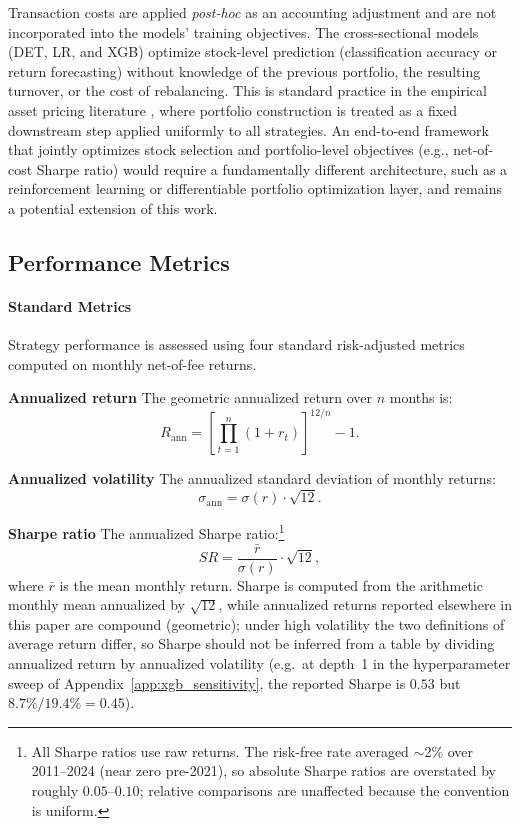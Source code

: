 Transaction costs are applied \emph{post-hoc} as an accounting adjustment and are not incorporated into the models' training objectives. The cross-sectional models (DET, LR, and XGB) optimize stock-level prediction (classification accuracy or return forecasting) without knowledge of the previous portfolio, the resulting turnover, or the cost of rebalancing. This is standard practice in the empirical asset pricing literature \citep[e.g.,][]{FamaFrench2015, GHM2023}, where portfolio construction is treated as a fixed downstream step applied uniformly to all strategies. An end-to-end framework that jointly optimizes stock selection and portfolio-level objectives (e.g., net-of-cost Sharpe ratio) would require a fundamentally different architecture, such as a reinforcement learning or differentiable portfolio optimization layer, and remains a potential extension of this work.

\subsection{Performance Metrics}\label{app:evaluation}

\paragraph{Standard Metrics}

Strategy performance is assessed using four standard risk-adjusted metrics computed on monthly net-of-fee returns.

\textbf{Annualized return} The geometric annualized return over $n$ months is:
\begin{equation}
    R_{\text{ann}} = \left[\prod_{t=1}^{n}(1 + r_t)\right]^{12/n} - 1.
\end{equation}

\textbf{Annualized volatility} The annualized standard deviation of monthly returns:
\begin{equation}
    \sigma_{\text{ann}} = \sigma(r) \cdot \sqrt{12}.
\end{equation}

\textbf{Sharpe ratio} The annualized Sharpe ratio:\footnote{All Sharpe ratios use raw returns. The risk-free rate averaged $\sim$2\% over 2011--2024 (near zero pre-2021), so absolute Sharpe ratios are overstated by roughly $0.05$--$0.10$; relative comparisons are unaffected because the convention is uniform.}
\begin{equation}
    SR = \frac{\bar{r}}{\sigma(r)} \cdot \sqrt{12},
\end{equation}
where $\bar{r}$ is the mean monthly return. Sharpe is computed from the arithmetic monthly mean annualized by $\sqrt{12}$, while annualized returns reported elsewhere in this paper are compound (geometric); under high volatility the two definitions of average return differ, so Sharpe should not be inferred from a table by dividing annualized return by annualized volatility (e.g.\ at depth~1 in the hyperparameter sweep of Appendix~\ref{app:xgb_sensitivity}, the reported Sharpe is $0.53$ but $8.7\% / 19.4\% = 0.45$).

